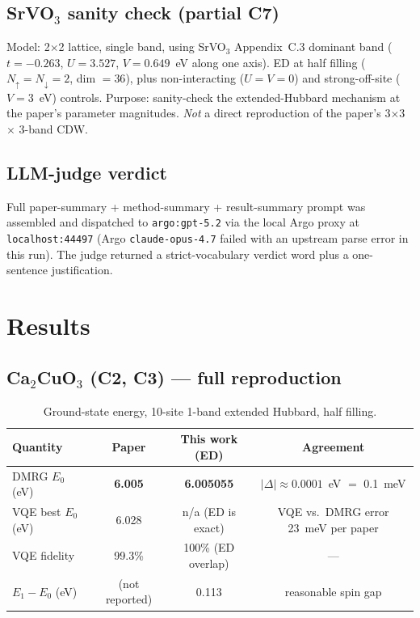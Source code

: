 \documentclass[11pt]{article}
\begin{document}
\subsection{SrVO$_3$ sanity check (partial C7)}

Model: 2$\times$2 lattice, single band, using SrVO$_3$ Appendix~C.3 dominant band ($t=-0.263$, $U=3.527$, $V=0.649$~eV along one axis). ED at half filling ($N_\uparrow=N_\downarrow=2$, dim $=36$), plus non-interacting ($U=V=0$) and strong-off-site ($V=3$~eV) controls. Purpose: sanity-check the extended-Hubbard mechanism at the paper's parameter magnitudes. \emph{Not} a direct reproduction of the paper's 3$\times$3 $\times$ 3-band CDW.

\subsection{LLM-judge verdict}

Full paper-summary + method-summary + result-summary prompt was assembled and dispatched to \texttt{argo:gpt-5.2} via the local Argo proxy at \texttt{localhost:44497} (Argo \texttt{claude-opus-4.7} failed with an upstream parse error in this run). The judge returned a strict-vocabulary verdict word plus a one-sentence justification.

\section{Results}

\subsection{Ca$_2$CuO$_3$ (C2, C3) --- full reproduction}

\begin{table}[h!]
\centering
\caption{Ground-state energy, 10-site 1-band extended Hubbard, half filling.}
\begin{tabular}{lccc}
\toprule
Quantity & Paper & This work (ED) & Agreement \\
\midrule
DMRG $E_0$ (eV) & \textbf{6.005} & \textbf{6.005055} & $|\Delta| \approx 0.0001$~eV $=$ 0.1~meV \\
VQE best $E_0$ (eV) & 6.028 & n/a (ED is exact) & VQE vs.\ DMRG error 23~meV per paper \\
VQE fidelity & 99.3\% & 100\% (ED overlap) & --- \\
$E_1 - E_0$ (eV) & (not reported) & 0.113 & reasonable spin gap \\
\bottomrule
\end{tabular}
\end{table}
\end{document}
